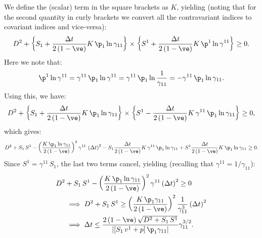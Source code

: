 \documentclass[10pt,preprint]{aastex}
\begin{document}
We define the (scalar) term in the square brackets as $K$, yielding (noting that for the second quantity in curly brackets we convert all the contravariant indices to covariant indices and vice-versa):
\begin{equation*}
    D^{2}+\left\{S_{1}+\f{\Delta t}{2\left(1-\ve\right)}K\,\p_{1}\ln\gamma_{11}\right\}\times\left\{S^{1}+\f{\Delta t}{2\left(1-\ve\right)}K\,\p^{1}\ln\gamma^{11}\right\}\geq0.
\end{equation*}
Here we note that:
\begin{equation*}
    \p^{1}\ln\gamma^{11}=\gamma^{11}\,\p_{1}\ln\gamma^{11}=\gamma^{11}\,\p_{1}\ln\f{1}{\gamma_{11}}=-\gamma^{11}\,\p_{1}\ln\gamma_{11}.
\end{equation*}
Using this, we have:
\begin{equation*}
    D^{2}+\left\{S_{1}+\f{\Delta t}{2\left(1-\ve\right)}K\,\p_{1}\ln\gamma_{11}\right\}\times\left\{S^{1}-\f{\Delta t}{2\left(1-\ve\right)}K\,\gamma^{11}\,\p_{1}\ln\gamma_{11}\right\}\geq0,
\end{equation*}
which gives:
\begin{equation*}
    D^{2}+S_{1}\,S^{1}-\left(\f{K\,\p_{1}\ln\gamma_{11}}{2\left(1-\ve\right)}\right)^{2}\gamma^{11}\,\left(\Delta t\right)^{2}-S_{1}\f{\Delta t}{2\left(1-\ve\right)}K\,\gamma^{11}\,\p_{1}\ln\gamma_{11}+S^{1}\f{\Delta t}{2\left(1-\ve\right)}K\,\p_{1}\ln\gamma_{11}\geq0.
\end{equation*}
Since $S^{1}=\gamma^{11}\,S_{1}$, the last two terms cancel, yielding (recalling that $\gamma^{11}=1/\gamma_{11}$):
\begin{align*}
    D^{2}&+S_{1}\,S^{1}-\left(\f{K\,\p_{1}\ln\gamma_{11}}{2\left(1-\ve\right)}\right)^{2}\gamma^{11}\left(\Delta t\right)^{2}\geq0\\
    &\implies D^{2}+S_{1}\,S^{1}\geq\left(\f{K\,\p_{1}\gamma_{11}}{2\left(1-\ve\right)}\right)^{2}\f{1}{\gamma_{11}^{3}}\left(\Delta t\right)^{2}\\
    &\implies\Delta t\leq\f{2\left(1-\ve\right)\sqrt{D^{2}+S_{1}\,S^{1}}}{\left|\left[S_{1}\,v^{1}+p\right]\p_{1}\gamma_{11}\right|}\gamma_{11}^{3/2}.
\end{align*}

\newpage








\end{document}
